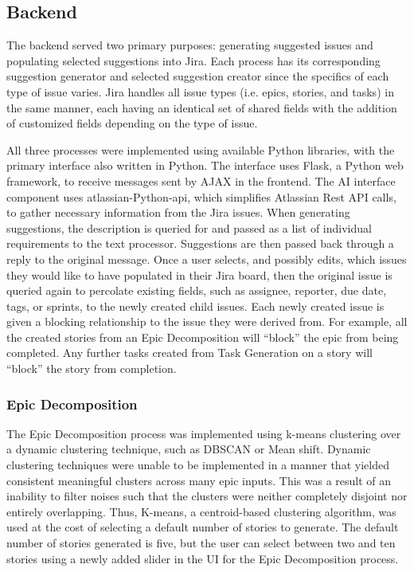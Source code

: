 \subsection{Backend}

The backend served two primary purposes: generating suggested issues and populating selected suggestions into Jira. Each process has its corresponding suggestion generator and selected suggestion creator since the specifics of each type of issue varies. Jira handles all issue types (i.e. epics, stories, and tasks) in the same manner, each having an identical set of shared fields with the addition of customized fields depending on the type of issue.

All three processes were implemented using available Python libraries, with the primary interface also written in Python. The interface uses Flask\cite{flask}, a Python web framework, to receive messages sent by AJAX in the frontend. The AI interface component uses atlassian-Python-api\cite{jiraPython}, which simplifies Atlassian Rest API\cite{jira5} calls, to gather necessary information from the Jira issues. When generating suggestions, the description is queried for and passed as a list of individual requirements to the text processor. Suggestions are then passed back through a reply to the original message. Once a user selects, and possibly edits, which issues they would like to have populated in their Jira board, then the original issue is queried again to percolate existing fields, such as assignee, reporter, due date, tags, or sprints, to the newly created child issues. Each newly created issue is given a blocking relationship to the issue they were derived from. For example, all the created stories from an Epic Decomposition will “block” the epic from being completed. Any further tasks created from Task Generation on a story will “block” the story from completion.

\subsubsection{Epic Decomposition}

The Epic Decomposition process was implemented using k-means clustering over a dynamic clustering technique, such as DBSCAN or Mean shift. Dynamic clustering techniques were unable to be implemented in a manner that yielded consistent meaningful clusters across many epic inputs. This was a result of an inability to filter noises such that the clusters were neither completely disjoint nor entirely overlapping. Thus, K-means, a centroid-based clustering algorithm, was used at the cost of selecting a default number of stories to generate. The default number of stories generated is five, but the user can select between two and ten stories using a newly added slider in the UI for the Epic Decomposition process.

